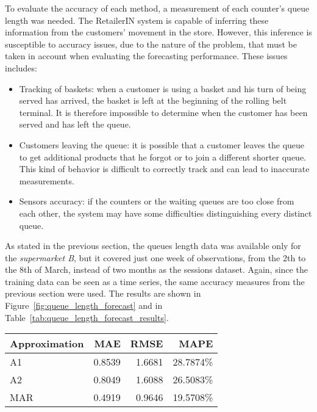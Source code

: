 To evaluate the accuracy of each method, a measurement of each counter’s queue length was needed. The RetailerIN system is capable of inferring these information from the customers’ movement in the store. However, this inference is susceptible to accuracy issues, due to the nature of the problem, that must be taken in account when evaluating the forecasting performance. These issues includes:
\begin{itemize}
  \item Tracking of baskets: when a customer is using a basket and his turn of being served has arrived, the basket is left at the beginning of the rolling belt terminal. It is therefore impossible to determine when the customer has been served and has left the queue.
  \item Customers leaving the queue: it is possible that a customer leaves the queue to get additional products that he forgot or to join a different shorter queue. This kind of behavior is difficult to correctly track and can lead to inaccurate measurements.
  \item Sensors accuracy: if the counters or the waiting queues are too close from each other, the system may have some difficulties distinguishing every distinct queue.
\end{itemize}

As stated in the previous section, the queues length data was available only for the \emph{supermarket B}, but it covered just one week of observations, from the 2th to the 8th of March, instead of two months as the sessions dataset. Again, since the training data can be seen as a time series, the same accuracy measures from the previous section were used. The results are shown in Figure~\ref{fig:queue_length_forecast} and in Table~\ref{tab:queue_length_forecast_results}.

\begin{center}
  \begin{tabular}{ l r r r }
    \hline
    Approximation & MAE    & RMSE   & MAPE      \\
    \hline
    A1            & 0.8539 & 1.6681 & 28.7874\% \\
    A2            & 0.8049 & 1.6088 & 26.5083\% \\
    MAR           & 0.4919 & 0.9646 & 19.5708\% \\
    \hline
  \end{tabular}
\end{center}

